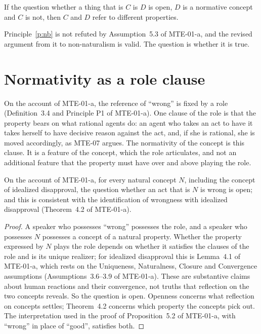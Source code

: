 \documentclass{situationist-preprint}
\begin{document}
\begin{principle}\label{p:nb}
If the question whether a thing that is $C$ is $D$ is open, $D$ is a normative concept and $C$ is not, then $C$ and $D$ refer to different properties.
\end{principle}

Principle~\ref{p:nb} is not refuted by Assumption~5.3 of MTE-01-a, and the revised argument from it to non-naturalism is valid. The question is whether it is true.

\section{Normativity as a role clause}\label{s:role}

On the account of MTE-01-a, the reference of \enquote{wrong} is fixed by a role (Definition~3.4 and Principle P1 of MTE-01-a). One clause of the role is that the property bears on what rational agents do: an agent who takes an act to have it takes herself to have decisive reason against the act, and, if she is rational, she is moved accordingly, as MTE-07 argues. The normativity of the concept is this clause. It is a feature of the concept, which the role articulates, and not an additional feature that the property must have over and above playing the role.

\begin{proposition}\label{p:open}
On the account of MTE-01-a, for every natural concept $N$, including the concept of idealized disapproval, the question whether an act that is $N$ is wrong is open; and this is consistent with the identification of wrongness with idealized disapproval (Theorem~4.2 of MTE-01-a).
\end{proposition}

\begin{proof}
A speaker who possesses \enquote{wrong} possesses the role, and a speaker who possesses $N$ possesses a concept of a natural property. Whether the property expressed by $N$ plays the role depends on whether it satisfies the clauses of the role and is its unique realizer; for idealized disapproval this is Lemma~4.1 of MTE-01-a, which rests on the Uniqueness, Naturalness, Closure and Convergence assumptions (Assumptions~3.6--3.9 of MTE-01-a). These are substantive claims about human reactions and their convergence, not truths that reflection on the two concepts reveals. So the question is open. Openness concerns what reflection on concepts settles; Theorem~4.2 concerns which property the concepts pick out. The interpretation used in the proof of Proposition~5.2 of MTE-01-a, with \enquote{wrong} in place of \enquote{good}, satisfies both.
\end{proof}
\end{document}

